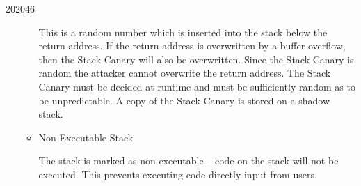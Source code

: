 \documentclass[10pt,\jkfside,a4paper]{article}
\begin{document}
\begin{examquestion}{2020}{4}{6}
\begin{enumerate}
\begin{itemize}
This is a random number which is inserted into the stack below the return
address. If the return address is overwritten by a buffer overflow, then the
Stack Canary will also be overwritten. Since the Stack Canary is random
the attacker cannot overwrite the return address. The Stack Canary must be
decided at runtime and must be sufficiently random as to be unpredictable. A
copy of the Stack Canary is stored on a shadow stack.

\item Non-Executable Stack

The stack is marked as non-executable -- code on the stack will not be
executed. This prevents executing code directly input from users.

\end{itemize}

\end{enumerate}

\end{examquestion}
\end{document}
